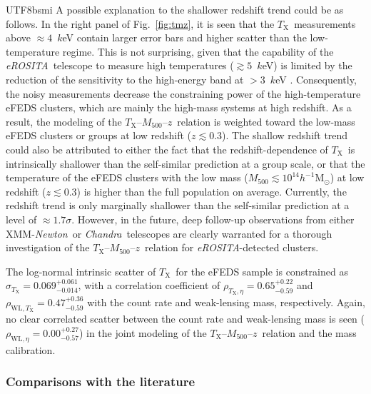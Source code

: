 \documentclass[longauth]{aa}
\newcommand{\Msunh}{\ensuremath{h^{-1}\mathrm{M}_{\odot}}}
\newcommand{\Mfiveoo}{\ensuremath{M_{500}}}
\newcommand{\redshift}{\ensuremath{z}}
\newcommand{\CHANDRA}{\emph{Chandra}}
\newcommand{\XMMNEWTON}{XMM-\emph{Newton}}
\newcommand{\eROSITA}{\emph{eROSITA}}
\newcommand{\Tx}{\ensuremath{T_{\mathrm{X}}}}
\newcommand{\rate}{\ensuremath{\eta}}
\newcommand{\sigmat}{\ensuremath{\sigma_{T_{\mathrm{X}}}}}
\newcommand{\anssigmat}{\ensuremath{ 0.069^{+0.061}_{-0.014} }}
\newcommand{\ansrhowlt}{\ensuremath{ 0.47^{+0.36}_{-0.59} }}
\newcommand{\ansrhowletat}{\ensuremath{ 0.00^{+0.27}_{-0.57} }}
\newcommand{\ansrhoteta}{\ensuremath{ 0.65^{+0.22}_{-0.59}  }}
\begin{document}
\begin{CJK*}{UTF8}{bsmi}
A possible explanation to the shallower redshift trend could be as follows.
In the right panel of Fig.~\ref{fig:tmz}, it is seen that the \Tx\ measurements above $\approx4$~$k$eV contain larger error bars and higher scatter than the low-temperature regime.
This is not surprising, given that the capability of the \eROSITA\ telescope to measure high temperatures ($\gtrsim5$~$k$eV) is limited by the reduction of the sensitivity to the high-energy band at $>3$~$k$eV \citep{liu21}.
Consequently, the noisy measurements decrease the constraining power of the high-temperature eFEDS clusters, which are mainly the high-mass systems at high redshift.
As a result, the modeling of the \Tx--\Mfiveoo--\redshift\ relation is weighted toward the low-mass eFEDS clusters or groups at low redshift ($\redshift\lesssim0.3$).
The shallow redshift trend could also be attributed to either the fact that the redshift-dependence of \Tx\ is intrinsically shallower than the self-similar prediction at a group scale,
or that the temperature of the eFEDS clusters with the low mass ($\Mfiveoo\lesssim10^{14}\Msunh$) at low redshift ($\redshift\lesssim0.3$) is higher than the full population on average.
Currently, the redshift trend is only marginally shallower than the self-similar prediction at a level of $\approx1.7\sigma$.
However, in the future,  deep follow-up observations from either \XMMNEWTON\ or \CHANDRA\ telescopes are clearly warranted for a thorough investigation of the \Tx--\Mfiveoo--\redshift\ relation for \eROSITA-detected clusters.


The log-normal intrinsic scatter of \Tx\ for the eFEDS sample is constrained as $\sigmat=\anssigmat$, with a correlation coefficient of $\rho_{\Tx,\rate} = \ansrhoteta$ and $\rho_{\mathrm{WL},\Tx} =\ansrhowlt$ with the count rate and weak-lensing mass, respectively.
Again, no clear correlated scatter between the count rate and weak-lensing mass is seen ($\rho_{\mathrm{WL},\rate} = \ansrhowletat$) in the joint modeling of the \Tx--\Mfiveoo--\redshift\ relation and the mass calibration.


\subsubsection*{Comparisons with the literature}


\end{CJK*}
\end{document}
